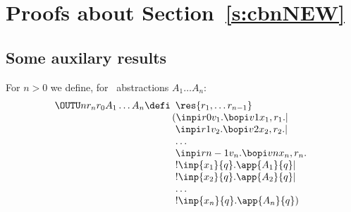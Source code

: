 




%
%
%
%
%
\section{Proofs about Section~\ref{s:cbnNEW}}
\label{a:cbn}
             
\subsection{Some auxilary results}



             

For $n>0$ we  define, for \piI\ abstractions  $A_1 \ldots A_n$:
\[\begin{array}{l}
\OUTU n {r_n}{r_0} {A_1 \ldots A_n}{} \defi 
\begin{array}[t]{l}
\res{r_1, \ldots r_{n-1}} \\
\! \! (\inpi r 0 {v_1} . \bopi v 1{x_{1},r_{1}}.    
 | \\
\inpi r 1 {v_2} . \bopi v 2{x_{2},r_{2}}    .  
 | \\
\ldots  \\
\inpi r {n-1} {v_n} . \bopi v n{x_{n},r_{n}}    .  
 \\
  !  \inp {x_1} {q} . {\app{A_1}{q} } | \\
  !  \inp {x_2} {q} . {\app{A_2}{q} } | \\
\ldots  \\
  !  \inp {x_n} {q} . {\app{A_n}{q} } )
  \end{array} 
  \end{array} 
\]



